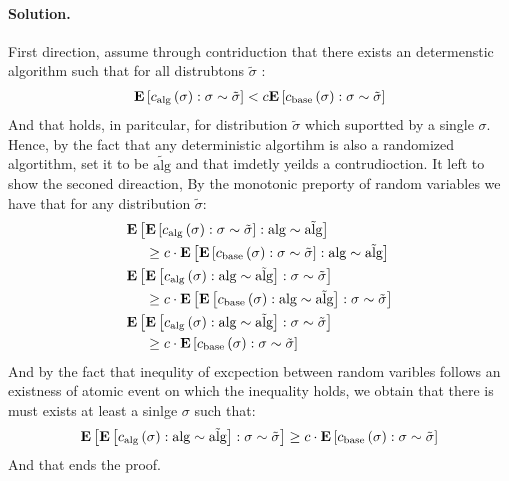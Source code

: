 \documentclass{article}
\begin{document}
\begin{multicols*}{2}
  \paragraph{Solution.} First direction, assume through contriduction that there exists an determenstic algorithm such that for all distrubtons $\tilde{\sigma}$ :
  \begin{equation*}
    \begin{split}
      \dsig{  \calg\left( \sigma \right)  } < c \dsig{ \cbase \left( \sigma \right)  }
    \end{split}
  \end{equation*} And that holds, in paritcular, for distribution $\tilde{\sigma}$ which suportted by a single $\sigma$. Hence, by the fact that any deterministic algortihm is also a randomized algortithm, set it to be $ \tilde{\text{alg}}$ and that imdetly yeilds a contrudioction. 
  It left to show the seconed direaction, By the monotonic preporty of random variables we have that for any distribution $\tilde{\sigma}$: 
  \begin{equation*}
    \begin{split}
      &  \dalg{ \dsig{ \calg\left( \sigma \right) } } \\
      & \ \  \ \ \ge c \cdot \dalg{ \dsig{  \cbase\left( \sigma \right) } } \\
      & \dsig{ \dalg{ \calg\left( \sigma \right) } } \\
      &  \ \  \ \ \ge c \cdot \dsig{ \dalg{  \cbase\left( \sigma \right) } } \\
      & \dsig{ \dalg{ \calg\left( \sigma \right) } } \\
      & \ \ \ \  \ge c \cdot \dsig{  \cbase\left( \sigma \right) }  
    \end{split}
  \end{equation*}
  And by the fact that inequlity of excpection between random varibles follows an existness of atomic event on which the inequality holds, we obtain that there is must exists at least a sinlge $\sigma$ such that:
  \begin{equation*}
    \begin{split}
      \dsig{ \dalg{ \calg\left( \sigma \right) } } \ge c \cdot \dsig{  \cbase\left( \sigma \right) }  
    \end{split}
  \end{equation*}
  And that ends the proof.
\end{multicols*}
\printbibliography 
\end{document}
